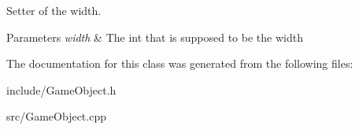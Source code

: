 Setter of the width. 


\begin{DoxyParams}{Parameters}
{\em width} & The int that is supposed to be the width \\
\hline
\end{DoxyParams}


The documentation for this class was generated from the following files\+:\begin{DoxyCompactItemize}
\item 
include/Game\+Object.\+h\item 
src/Game\+Object.\+cpp\end{DoxyCompactItemize}
